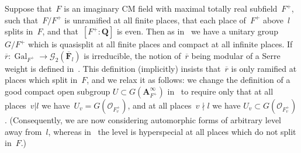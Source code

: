 \documentclass{amsart}
\renewcommand{\mathbb}{\mathbf}
\renewcommand{\ell}{l}
\theoremstyle{definition}
\theoremstyle{remark}
\newcommand{\A}{\AA}
\newcommand{\F}{\FF}
\newcommand{\Q}{\QQ}
\renewcommand{\AA}{{\mathbb A}}
\newcommand{\FF}{{\mathbb F}}
\newcommand{\QQ}{{\mathbb Q}}
\newcommand{\cG}{{\mathcal G}}
\newcommand{\cO}{{\mathcal O}}
\newcommand{\Fbar}{\overline{\F}}
\newcommand{\Flbar}{\Fbar_{\ell}}
\DeclareMathOperator{\Gal}{Gal}
\newcommand{\rbar}{\overline{r}}
\begin{document}
Suppose that~$F$ is an imaginary CM field with maximal totally real
subfield~$F^+$, such that~$F/F^+$ is unramified at all finite places,
that each place of~$F^+$ above~$l$ splits in~$F$, and that~$[F^+:\Q]$
is even. Then as in~\cite{MR3072811} we have a unitary group~$G/F^+$
which is quasisplit at all finite places and compact at all infinite
places. If $\rbar:\Gal_{F^+}\to\cG_2(\Flbar)$ is irreducible, the
notion of~$\rbar$ being modular of a Serre weight is defined
in~\cite[Defn.\ 2.1.9]{MR3072811}. This definition (implicitly)
insists that~$\rbar$ is only ramified at places which split in~$F$,
and we relax it as follows: we change the definition of a good compact
open subgroup $U\subset G(\A_{F^+}^\infty)$ in~\cite[Defn.\
2.1.5]{MR3072811} to require only that at all places~$v|l$ we
have~$U_v=G(\cO_{F^+_v})$, and at all places~$v\nmid l$ we have
$U_v\subset G(\cO_{F^+_v})$. (Consequently, we are now considering
automorphic forms of arbitrary level away from~$l$, whereas
in~\cite{MR3072811} the level is hyperspecial at all places which do
not split in~$F$.)
\end{document}
